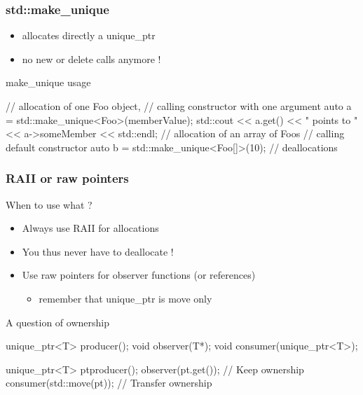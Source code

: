 \begin{frame}[fragile]
  \frametitle{std::make\_unique}
  \begin{block}{}
    \begin{itemize}
    \item allocates directly a unique\_ptr
    \item no new or delete calls anymore !
    \end{itemize}
  \end{block}
  \pause
  \begin{exampleblock}{make\_unique usage}
    \begin{cppcode*}{}
      // allocation of one Foo object,
      // calling constructor with one argument
      auto a = std::make_unique<Foo>(memberValue);
      std::cout << a.get() << " points to "
                << a->someMember << std::endl;
      // allocation of an array of Foos
      // calling default constructor
      auto b = std::make_unique<Foo[]>(10);
      // deallocations
    \end{cppcode*}
  \end{exampleblock}
\end{frame}

\begin{frame}[fragile]
  \frametitle{RAII or raw pointers}
  \begin{block}{When to use what ?}
    \begin{itemize}
    \item Always use RAII for allocations
    \item You thus never have to deallocate !
    \item Use raw pointers for observer functions (or references)
      \begin{itemize}
      \item remember that unique\_ptr is move only
      \end{itemize}
    \end{itemize}
  \end{block}
  \pause
  \begin{exampleblock}{A question of ownership}
    \begin{cppcode*}{}
      unique_ptr<T> producer();
      void observer(T*);
      void consumer(unique_ptr<T>);

      unique_ptr<T> pt{producer()};
      observer(pt.get());       // Keep ownership
      consumer(std::move(pt));  // Transfer ownership
    \end{cppcode*}
  \end{exampleblock}
\end{frame}

